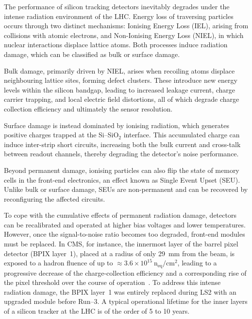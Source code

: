 The performance of silicon tracking detectors inevitably degrades under the intense radiation environment of the LHC. Energy loss of traversing particles occurs through two distinct mechanisms: Ionising Energy Loss (IEL), arising from collisions with atomic electrons, and Non-Ionising Energy Loss (NIEL), in which nuclear interactions displace lattice atoms. Both processes induce radiation damage, which can be classified as bulk or surface damage.

\vspace{0.5 cm}

Bulk damage, primarily driven by NIEL, arises when recoiling atoms displace neighbouring lattice sites, forming defect clusters. These introduce new energy levels within the silicon bandgap, leading to increased leakage current, charge carrier trapping, and local electric field distortions, all of which degrade charge collection efficiency and ultimately the sensor resolution.

Surface damage is instead dominated by ionising radiation, which generates positive charges trapped at the Si–Si$\mathrm{O}_2$ interface. This accumulated charge can induce inter-strip short circuits, increasing both the bulk current and cross-talk between readout channels, thereby degrading the detector's noise performance.

Beyond permanent damage, ionising particles can also flip the state of memory cells in the front-end electronics, an effect known as Single Event Upset (SEU). Unlike bulk or surface damage, SEUs are non-permanent and can be recovered by reconfiguring the affected circuits.

\vspace{0.5 cm}

To cope with the cumulative effects of permanent radiation damage, detectors can be recalibrated and operated at higher bias voltages and lower temperatures. However, once the signal-to-noise ratio becomes too degraded, front-end modules must be replaced. In CMS, for instance, the innermost layer of the barrel pixel detector (BPIX layer~1), placed at a radius of only 29~mm from the beam, is exposed to a hadron fluence of up to ${\approx}3.6\times10^{15}~\mathrm{n}_{\mathrm{eq}}/\mathrm{cm^{2}}$, leading to a progressive decrease of the charge-collection efficiency and a corresponding rise of the pixel threshold over the course of operation~\cite{CMSPhase1Pixel2021}. To address this intense radiation damage, the BPIX layer~1 was entirely replaced during LS2 with an upgraded module before Run--3. A typical operational lifetime for the inner layers of a silicon tracker at the LHC is of the order of 5 to 10 years.


